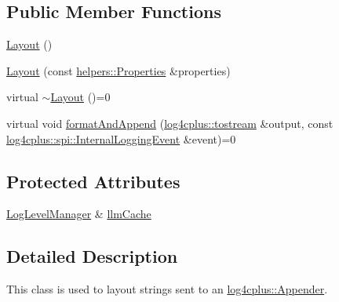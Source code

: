 \subsection*{Public Member Functions}
\begin{DoxyCompactItemize}
\item 
\hyperlink{classlog4cplus_1_1Layout_aff5f50f67ff7d8190bf264c86bf0c3ea}{Layout} ()
\item 
\hyperlink{classlog4cplus_1_1Layout_a65fea9f2d718a10c4c5d563c9c5fe576}{Layout} (const \hyperlink{classlog4cplus_1_1helpers_1_1Properties}{helpers\-::\-Properties} \&properties)
\item 
virtual \hyperlink{classlog4cplus_1_1Layout_ac0e14ff88fd9e17288da3e1d4bf6ed20}{$\sim$\-Layout} ()=0
\item 
virtual void \hyperlink{classlog4cplus_1_1Layout_afbcbad298d1a40aa6f717ac039e0e341}{format\-And\-Append} (\hyperlink{namespacelog4cplus_aef9e0c9a1adafed82c39fdef478716e1}{log4cplus\-::tostream} \&output, const \hyperlink{classlog4cplus_1_1spi_1_1InternalLoggingEvent}{log4cplus\-::spi\-::\-Internal\-Logging\-Event} \&event)=0
\end{DoxyCompactItemize}
\subsection*{Protected Attributes}
\begin{DoxyCompactItemize}
\item 
\hyperlink{classlog4cplus_1_1LogLevelManager}{Log\-Level\-Manager} \& \hyperlink{classlog4cplus_1_1Layout_adc5f290d6f829ce0b9dc42d9e8feda2c}{llm\-Cache}
\end{DoxyCompactItemize}


\subsection{Detailed Description}
This class is used to layout strings sent to an \hyperlink{classlog4cplus_1_1Appender}{log4cplus\-::\-Appender}. 


